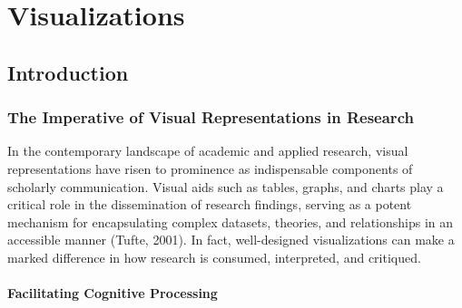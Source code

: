 \documentclass[
  b5paper]{book}
\newenvironment{Shaded}{\begin{snugshade}}{\end{snugshade}}
\newcommand{\FunctionTok}[1]{\textcolor[rgb]{0.13,0.29,0.53}{\textbf{#1}}}
\newcommand{\NormalTok}[1]{#1}
\newcommand{\OtherTok}[1]{\textcolor[rgb]{0.56,0.35,0.01}{#1}}
\newcommand{\SpecialCharTok}[1]{\textcolor[rgb]{0.81,0.36,0.00}{\textbf{#1}}}
\begin{document}
\begin{Shaded}
\end{Shaded}

\hypertarget{visualizations}{%
\chapter{Visualizations}\label{visualizations}}

\hypertarget{introduction-6}{%
\section{Introduction}\label{introduction-6}}

\hypertarget{the-imperative-of-visual-representations-in-research}{%
\subsection*{The Imperative of Visual Representations in Research}\label{the-imperative-of-visual-representations-in-research}}

In the contemporary landscape of academic and applied research, visual representations have risen to prominence as indispensable components of scholarly communication. Visual aids such as tables, graphs, and charts play a critical role in the dissemination of research findings, serving as a potent mechanism for encapsulating complex datasets, theories, and relationships in an accessible manner (Tufte, 2001). In fact, well-designed visualizations can make a marked difference in how research is consumed, interpreted, and critiqued.

\hypertarget{facilitating-cognitive-processing}{%
\subsubsection*{Facilitating Cognitive Processing}\label{facilitating-cognitive-processing}}
\end{document}
